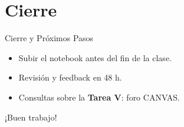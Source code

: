 \documentclass[10pt]{beamer}
\begin{document}
\section{Cierre}
\begin{frame}{Cierre y Próximos Pasos}
  \begin{itemize}
    \item Subir el notebook antes del fin de la clase.
    \item Revisión y feedback en 48 h.
    \item Consultas sobre la \textbf{Tarea V}: foro CANVAS.
  \end{itemize}
  \vspace{0.4cm}
  \Large{\centering ¡Buen trabajo!}
\end{frame}
\end{document}
